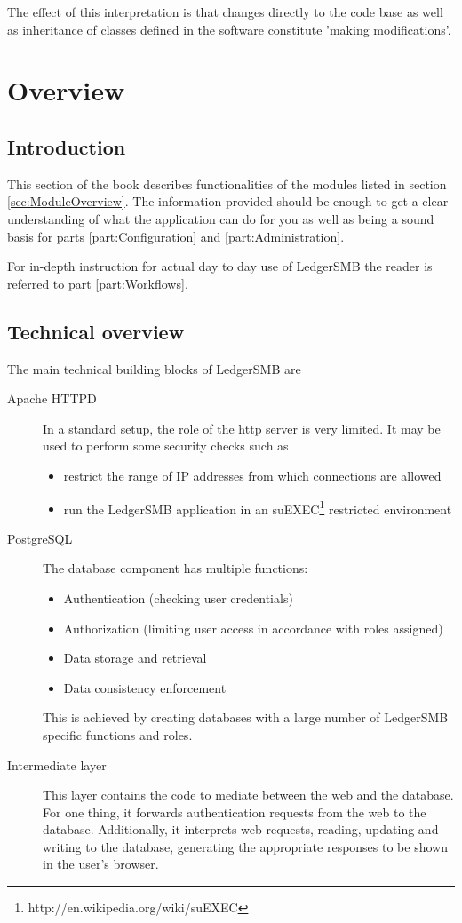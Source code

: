 \documentclass[10pt,A4]{book}
\begin{document}
The effect of this interpretation is that changes directly to the code base as
well as inheritance of classes defined in the software constitute 'making modifications'.


\chapter{Overview}

\section{Introduction}
This section of the book describes functionalities of the modules listed in section \ref{sec:ModuleOverview}.  The information provided should be enough to get a clear
understanding of what the application can do for you as well as being a sound basis
for parts \ref{part:Configuration} and \ref{part:Administration}.

For in-depth instruction for actual day to day use of LedgerSMB the reader is referred
to part \ref{part:Workflows}.

\section{Technical overview}




The main technical building blocks of LedgerSMB are

\begin{description}
\item[Apache HTTPD] In a standard setup, the role of the http server is very limited. It
may be used to perform some security checks such as
\begin{itemize}
\item restrict the range of IP addresses from which connections are allowed
\item run the LedgerSMB application in an
suEXEC\footnote{http://en.wikipedia.org/wiki/suEXEC} restricted environment
\end{itemize}
\item[PostgreSQL] The database component has multiple functions:
\begin{itemize}
\item Authentication (checking user credentials)
\item Authorization (limiting user access in accordance with roles assigned)
\item Data storage and retrieval
\item Data consistency enforcement
\end{itemize}
This is achieved by creating databases with a large number of LedgerSMB specific
functions and roles.
\item[Intermediate layer] This layer contains the code to mediate between the web
and the database.  For one thing, it forwards authentication requests from the web
to the database.  Additionally, it interprets web requests, reading, updating and
writing to the database, generating the appropriate responses to be shown in the
user's browser.
\end{description}
\end{document}
